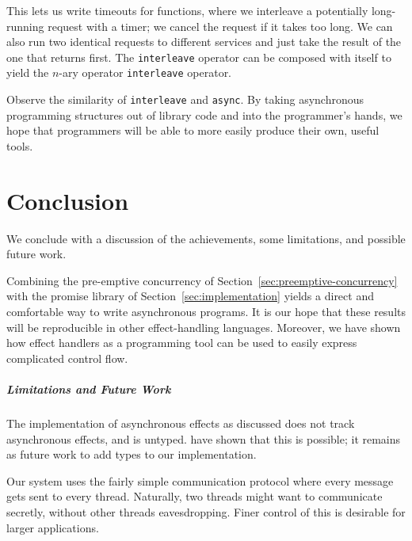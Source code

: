 \documentclass[msc,deptreport,cs]{infthesis} %
\newcommand{\code}[1]{\lstinline{#1}}
\newcommand{\todo}[1]
           {{\par\noindent\small\color{RoyalPurple}
  \framebox{\parbox{\dimexpr\linewidth-2\fboxsep-2\fboxrule}
    {\textbf{TODO:} #1}}}}
\begin{document}
This lets us write timeouts for functions, where we interleave a potentially
long-running request with a timer; we cancel the request if it takes too long.
We can also run two identical requests to different services and just take the
result of the one that returns first. The \code{interleave} operator can be
composed with itself to yield the $n$-ary operator \code{interleave} operator.

Observe the similarity of \code{interleave} and \code{async}. By taking
asynchronous programming structures out of library code and into the
programmer's hands, we hope that programmers will be able to more easily produce
their own, useful tools.


\chapter{Conclusion}
\label{chap:conclusion}

We conclude with a discussion of the achievements, some limitations, and
possible future work.

Combining the pre-emptive concurrency of
Section~\ref{sec:preemptive-concurrency} with the promise library of
Section~\ref{sec:implementation} yields a direct and comfortable way to write
asynchronous programs. It is our hope that these results will be reproducible in
other effect-handling languages.
%
Moreover, we have shown how effect handlers as a programming tool can be used to
easily express complicated control flow.

\todo{Add more to end of paragraph}

\paragraph*{Limitations and Future Work}

The implementation of asynchronous effects as discussed does not track
asynchronous effects, and is untyped. \citeauthor{ahman2020asynchronous} have
shown that this is possible; it remains as future work to add types to our
implementation.

Our system uses the fairly simple communication protocol where every message
gets sent to every thread. Naturally, two threads might want to communicate
secretly, without other threads eavesdropping. Finer control of this is
desirable for larger applications.


\end{document}

